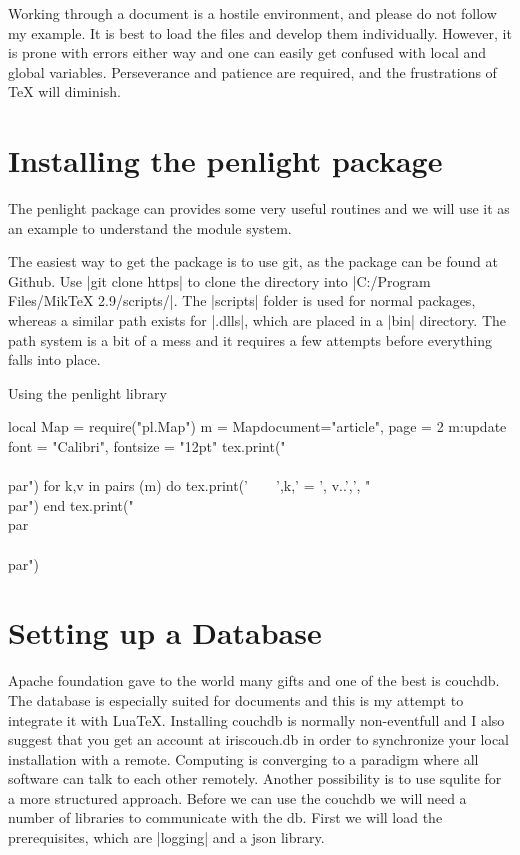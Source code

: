Working through a document is a hostile environment, and please do not follow my example. It is best to
load the files and develop them individually. However, it is prone with errors either way and one can easily get confused with local and global variables. Perseverance and patience are required, and the frustrations of TeX will diminish.

\section{Installing the penlight package}

The penlight package can provides some very useful routines and we will use it as an example
to understand the module system.

The easiest way to get the package is to use git, as the package can be found at Github. Use |git clone https|  to clone the directory into |C:/Program Files/MikTeX 2.9/scripts/|. The |scripts| folder is used for normal packages, whereas a similar path exists for |.dlls|, which are placed in a |bin| directory. The path system is a bit of a mess and it requires a few attempts before everything falls into place. 

\begin{texexample}{Using the penlight library}{}
\begin{luacode}
local Map = require("pl.Map")
       m = Map{document="article", 
                     page = 2}
       m:update {font = "Calibri", fontsize = "12pt"}               
       tex.print("\\{\\par")
       for k,v in pairs (m)  do
           tex.print('~~~~',k,' = ', v..',', "\\par")
       end   
       tex.print("\\par\\}\\par") 
\end{luacode}
\end{texexample}



\section{Setting up a Database}

Apache foundation gave to the world many gifts and one of the best is couchdb. The database is especially suited for documents and this is my attempt to integrate it with LuaTeX. Installing couchdb is normally non-eventfull and I also suggest that you get an account at iriscouch.db in order to synchronize your local installation with a remote. Computing is converging to a paradigm where all software can talk to each other remotely. Another possibility is to use squlite for a more structured approach. Before we can use the couchdb we will need  a number of libraries to communicate with the db. First we will load the prerequisites, which are |logging| and a json library. 

